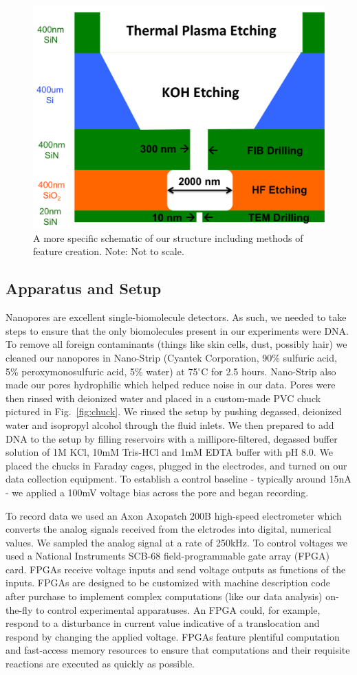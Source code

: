 \documentclass[aps,prl,preprint,groupedaddress]{revtex4}
\begin{document}
\begin{figure}
\centering
\includegraphics[width=.45\textwidth]{figures/structure-schematic}
\caption{A more specific schematic of our structure including methods of feature creation. Note: Not to scale.}
\label{fig:structure-schematic}
\end{figure}

\subsection{Apparatus and Setup}

Nanopores are excellent single-biomolecule detectors.
As such, we needed to take steps to ensure that the only biomolecules present in our experiments were DNA.
To remove all foreign contaminants (things like skin cells, dust, possibly hair) we cleaned our nanopores in Nano-Strip (Cyantek  Corporation, 90\% sulfuric acid, 5\% peroxymonosulfuric acid, 5\% water) at 75$^\circ$C for 2.5 hours.
Nano-Strip also made our pores hydrophilic which helped reduce noise in our data.
Pores were then rinsed with deionized water and placed in a custom-made PVC chuck pictured in Fig.~\ref{fig:chuck}.
We rinsed the setup by pushing degassed, deionized water and isopropyl alcohol through the fluid inlets.
We then prepared to add DNA to the setup by filling reservoirs with a millipore-filtered, degassed buffer solution of 1M KCl, 10mM Tris-HCl and 1mM EDTA buffer with pH 8.0.
We placed the chucks in Faraday cages, plugged in the electrodes, and turned on our data collection equipment.
To establish a control baseline - typically around 15nA - we applied a 100mV voltage bias across the pore and began recording.

To record data we used an Axon Axopatch 200B high-speed electrometer which converts the analog signals received from the elctrodes into digital, numerical values.
We sampled the analog signal at a rate of 250kHz.
To control voltages we used a National Instruments SCB-68 field-programmable gate array (FPGA) card.
FPGAs receive voltage inputs and send voltage outputs as functions of the inputs.
FPGAs are designed to be customized with machine description code after purchase to implement complex computations (like our data analysis) on-the-fly to control experimental apparatuses.
An FPGA could, for example, respond to a disturbance in current value indicative of a translocation and respond by changing the applied voltage.
FPGAs feature plentiful computation and fast-access memory resources to ensure that computations and their requisite reactions are executed as quickly as possible.
\end{document}
